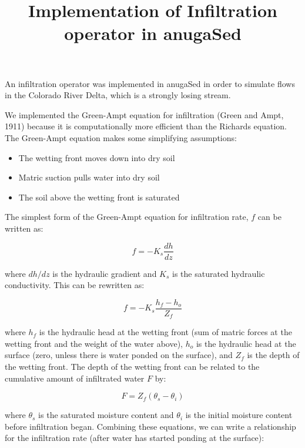 \documentclass[11pt]{article}
\begin{document}
\title{Implementation of Infiltration operator in anugaSed}
\date{}
\maketitle

An infiltration operator was implemented in anugaSed in order to simulate flows in the Colorado River Delta, which is a strongly losing stream.

We implemented the Green-Ampt equation for infiltration (Green and Ampt, 1911) because it is computationally more efficient than the Richards equation. The Green-Ampt equation makes some simplifying assumptions:

\begin{itemize}
\item The wetting front moves down into dry soil
\item Matric suction pulls water into dry soil
\item The soil above the wetting front is saturated
\end{itemize}

The simplest form of the Green-Ampt equation for infiltration rate, $f$ can be written as:

\begin{equation}
f = -K_s \frac{dh}{dz}
\end{equation}

\noindent where $dh/dz$ is the hydraulic gradient and $K_s$ is the saturated hydraulic conductivity. This can be rewritten as:

\begin{equation}
f = -K_s \frac{h_f - h_o}{Z_f}
\end{equation}

\noindent where $h_f$ is the hydraulic head at the wetting front (sum of matric forces at the wetting front and the weight of the water above), $h_o$ is the hydraulic head at the surface (zero, unless there is water ponded on the surface), and $Z_f$ is the depth of the wetting front. The depth of the wetting front can be related to the cumulative amount of infiltrated water $F$ by:

\begin{equation}
F = Z_f (\theta_s - \theta_i)
\end{equation}

\noindent where $\theta_s$ is the saturated moisture content and $\theta_i$ is the initial moisture content before infiltration began. Combining these equations, we can write a relationship for the infiltration rate (after water has started ponding at the surface):
\end{document}
